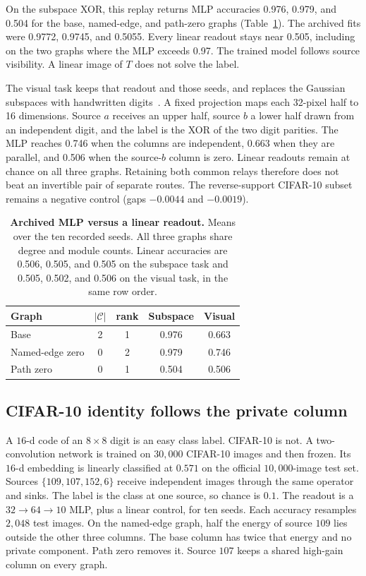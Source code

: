 On the subspace XOR, this replay returns MLP accuracies 0.976, 0.979, and
0.504 for the base, named-edge, and path-zero graphs
(Table~\ref{tab:executed}). The archived fits were 0.9772, 0.9745, and
0.5055. Every linear readout stays near 0.505, including on the two graphs
where the MLP exceeds 0.97. The trained model follows source visibility. A
linear image of $T$ does not solve the label.

The visual task keeps that readout and those seeds, and replaces the Gaussian
subspaces with handwritten digits~\cite{optdigits1998}. A fixed projection maps
each 32-pixel half to 16 dimensions. Source $a$ receives an upper half, source
$b$ a lower half drawn from an independent digit, and the label is the XOR of
the two digit parities. The MLP reaches 0.746 when the columns are independent,
0.663 when they are parallel, and 0.506 when the source-$b$ column is zero.
Linear readouts remain at chance on all three graphs. Retaining both
common relays therefore does not beat an invertible pair of separate routes.
The reverse-support CIFAR-10 subset remains a negative control
(gaps $-0.0044$ and $-0.0019$).

\begin{table}[t]
\centering
\caption{\textbf{Archived MLP versus a linear readout.} Means over the ten
recorded seeds. All three graphs share degree and module counts. Linear
accuracies are 0.506, 0.505, and 0.505 on the subspace task and 0.505,
0.502, and 0.506 on the visual task, in the same row order.}
\label{tab:executed}
\small
\setlength{\tabcolsep}{3pt}
\begin{tabular}{@{}lcccc@{}}
\toprule
Graph & $|\mathcal C|$ & rank & Subspace & Visual \\
\midrule
Base & 2 & 1 & 0.976 & 0.663 \\
Named-edge zero & 0 & 2 & 0.979 & 0.746 \\
Path zero & 0 & 1 & 0.504 & 0.506 \\
\bottomrule
\end{tabular}
\end{table}

\subsection{CIFAR-10 identity follows the private column}
\label{sec:population}

A $16$-d code of an $8{\times}8$ digit is an easy class label. CIFAR-10 is not.
A two-convolution network is trained on $30{,}000$ CIFAR-10 images and then
frozen. Its $16$-d embedding is linearly classified at $0.571$ on the official
$10{,}000$-image test set. Sources $\{109,107,152,6\}$ receive independent
images through the same operator and sinks. The label is the class at one
source, so chance is $0.1$. The readout is a $32\!\to\!64\!\to\!10$ MLP, plus
a linear control, for ten seeds. Each accuracy resamples $2{,}048$ test
images. On the named-edge graph, half the energy of source $109$ lies outside
the other three columns. The base column has twice that energy and no private
component. Path zero removes it. Source $107$ keeps a shared high-gain column
on every graph.

